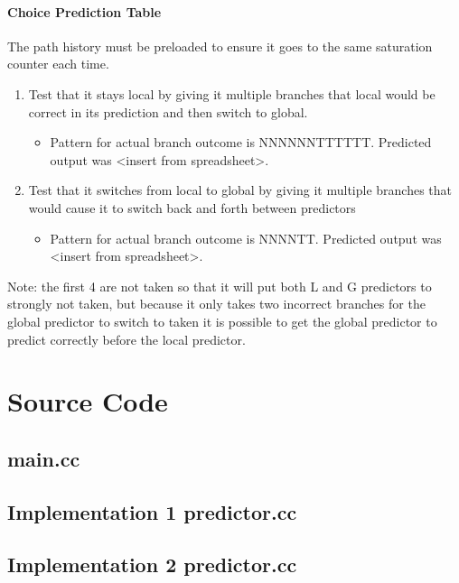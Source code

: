 \documentclass[]{report}   %
\begin{document}
\subsubsection{Choice Prediction Table}
The path history must be preloaded to ensure it goes to the same saturation counter each time.
\begin{enumerate}
  \item{Test that it stays local by giving it multiple branches that local would be correct in its prediction and then switch to global.}
    \begin{itemize}
      \item{Pattern for actual branch outcome is NNNNNNTTTTTT. Predicted output was <insert from spreadsheet>.}
    \end{itemize}
  \item{Test that it switches from local to global by giving it multiple branches that would cause it to switch back and forth between predictors}
    \begin{itemize}
      \item{Pattern for actual branch outcome is NNNNTT. Predicted output was <insert from spreadsheet>.}
    \end{itemize}
\end{enumerate}

Note: the first 4 are not taken so that it will put both L and G predictors to strongly not taken, but because it only takes two incorrect branches for the global predictor to switch to taken it is possible to get the global predictor to predict correctly before the local predictor.


\chapter{Source Code}
\section{main.cc}

\pagebreak

\section{Implementation 1 predictor.cc}

\pagebreak

\section{Implementation 2 predictor.cc}

\pagebreak



\end{document}
